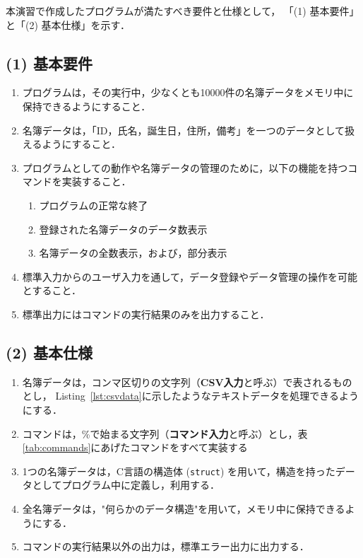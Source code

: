 本演習で作成したプログラムが満たすべき要件と仕様として，
「(1) 基本要件」と「(2) 基本仕様」を示す．

\subsection*{(1) 基本要件}

\begin{enumerate}
  \item プログラムは，その実行中，少なくとも10000件の名簿データをメモリ中に保持できるようにすること．
  \item 名簿データは，「ID，氏名，誕生日，住所，備考」を一つのデータとして扱えるようにすること．
  \item プログラムとしての動作や名簿データの管理のために，以下の機能を持つコマンドを実装すること．
  \begin{enumerate}
    \item プログラムの正常な終了
    \item 登録された名簿データのデータ数表示
    \item 名簿データの全数表示，および，部分表示
  \end{enumerate}
  \item 標準入力からのユーザ入力を通して，データ登録やデータ管理の操作を可能とすること．
  \item 標準出力にはコマンドの実行結果のみを出力すること．      %
\end{enumerate}

\subsection*{(2) 基本仕様}

\begin{enumerate}
  \item 名簿データは，コンマ区切りの文字列（\textbf{CSV入力}と呼ぶ）で表されるものとし，%
        Listing~\ref{lst:csvdata}に示したようなテキストデータを処理できるようにする．%
  \item コマンドは，\%で始まる文字列（\textbf{コマンド入力}と呼ぶ）とし，表\ref{tab:commands}にあげたコマンドをすべて実装する
  \item 1つの名簿データは，C言語の構造体 (\texttt{struct}) を用いて，構造を持ったデータとしてプログラム中に定義し，利用する．
  \item 全名簿データは，"何らかのデータ構造"を用いて，メモリ中に保持できるようにする．
  \item コマンドの実行結果以外の出力は，標準エラー出力に出力する．  %
  
\end{enumerate}

